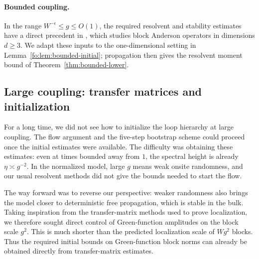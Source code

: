 \documentclass[11pt]{article}
\numberwithin{equation}{section}
\theoremstyle{remark}
\begin{document}
\paragraph{Bounded coupling.}
In the range $W^{-\epsilon}\le g\le O(1)$, the required resolvent
and stability estimates have a direct precedent in \cite[Section~8]{DYYY},
which studies block Anderson operators in dimensions $d\ge3$.
We adapt these inputs to the one-dimensional setting in
Lemma~\ref{fo:lem:bounded-initial}; propagation then gives the
resolvent moment bound of Theorem~\ref{thm:bounded-lower}.

\subsection{Large coupling: transfer matrices and initialization}
For a long time, we did not see how to initialize the loop hierarchy
at large coupling. The flow argument and the five-step bootstrap
scheme could proceed once the initial estimates were available.
The difficulty was obtaining these estimates: even at times bounded
away from $1$, the spectral height is already $\eta\asymp g^{-2}$.
In the normalized model, large $g$ means weak onsite randomness,
and our usual resolvent methods did not give the bounds needed to
start the flow.

The way forward was to reverse our perspective: weaker randomness
also brings the model closer to deterministic free propagation,
which is stable in the bulk. Taking inspiration from the
transfer-matrix methods used to prove localization, we therefore
sought direct control of Green-function amplitudes on the block
scale $g^2$. This is much shorter than the predicted localization
scale of $Wg^2$ blocks. Thus the required initial bounds on
Green-function block norms can already be obtained directly from
transfer-matrix estimates.
\end{document}
